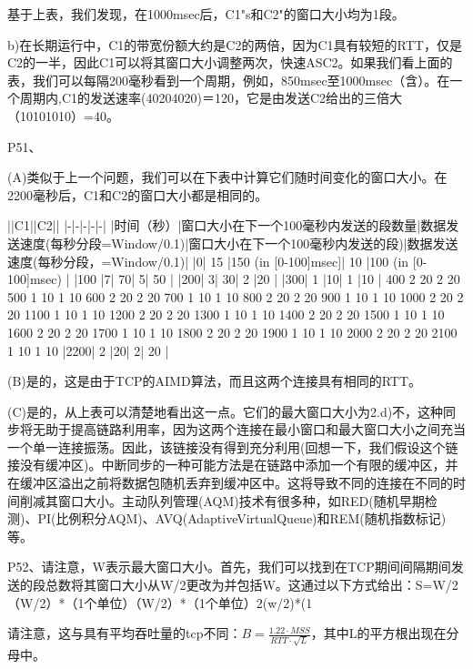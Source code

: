 \documentclass[11pt,UTF8,twoside]{article}
\begin{document}
	基于上表，我们发现，在1000msec后，C1"s和C2"的窗口大小均为1段。
	
	b)在长期运行中，C1的带宽份额大约是C2的两倍，因为C1具有较短的RTT，仅是C2的一半，因此C1可以将其窗口大小调整两次，快速ASC2。如果我们看上面的表，我们可以每隔200毫秒看到一个周期，例如，850msec至1000msec（含）。在一个周期内,C1的发送速率(40204020)＝120，它是由发送C2给出的三倍大（10101010）=40。
	
	P51、
	
	(A)类似于上一个问题，我们可以在下表中计算它们随时间变化的窗口大小。在2200毫秒后，C1和C2的窗口大小都是相同的。
	
	||C1||C2||
	|-|-|-|-|-|
	|时间（秒）|窗口大小在下一个100毫秒内发送的段数量|数据发送速度(每秒分段=Window/0.1)|窗口大小在下一个100毫秒内发送的段)|数据发送速度(每秒分段，=Window/0.1)|
	|0| 15 |150 (in [0-100]msec]| 10 |100 (in [0-100]msec) |
	|100 |7| 70| 5| 50 |
	|200| 3| 30| 2 |20 |
	|300| 1 |10| 1 |10 |
	400 2 20 2 20 
	500 1 10 1 10 
	600 2 20 2 20 
	700 1 10 1 10 
	800 2 20 2 20 
	900 1 10 1 10 
	1000 2 20 2 20 
	1100 1 10 1 10 
	1200 2 20 2 20 
	1300 1 10 1 10 
	1400 2 20 2 20 
	1500 1 10 1 10 
	1600 2 20 2 20 
	1700 1 10 1 10 
	1800 2 20 2 20 
	1900 1 10 1 10 
	2000 2 20 2 20 
	2100 1 10 1 10 
	|2200| 2 |20| 2| 20 |
	
	(B)是的，这是由于TCP的AIMD算法，而且这两个连接具有相同的RTT。
	
	(C)是的，从上表可以清楚地看出这一点。它们的最大窗口大小为2.d)不，这种同步将无助于提高链路利用率，因为这两个连接在最小窗口和最大窗口大小之间充当一个单一连接振荡。因此，该链接没有得到充分利用(回想一下，我们假设这个链接没有缓冲区)。中断同步的一种可能方法是在链路中添加一个有限的缓冲区，并在缓冲区溢出之前将数据包随机丢弃到缓冲区中。这将导致不同的连接在不同的时间削减其窗口大小。主动队列管理(AQM)技术有很多种，如RED(随机早期检测)、PI(比例积分AQM)、AVQ(AdaptiveVirtualQueue)和REM(随机指数标记)等。
	
	P52、请注意，W表示最大窗口大小。首先，我们可以找到在TCP期间间隔期间发送的段总数将其窗口大小从W/2更改为并包括W。这通过以下方式给出：S=W/2（W/2）*（1个单位）（W/2）*（1个单位）2(w/2)*(1%
	
	请注意，这与具有平均吞吐量的tcp不同：$B=\frac{1.22 \cdot MSS}{RTT \cdot \sqrt{L}}$，其中L的平方根出现在分母中。
	
\end{document}
